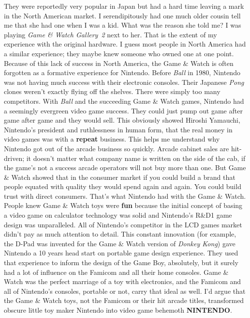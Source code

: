 \documentclass{book}
\begin{document}
They were reportedly very popular in Japan but had a hard time leaving a mark in the North American market. I serendipitously had one much older cousin tell me that she had one when I was a kid. What was the reason she told me? I was playing \emph{Game \& Watch Gallery~2} next to her. That is the extent of my experience with the original hardware. I guess most people in North America had a similar experience; they maybe knew someone who owned one at one point. Because of this lack of success in North America, the Game \& Watch is often forgotten as a formative experience for Nintendo. Before \emph{Ball} in 1980, Nintendo was not having much success with their electronic consoles. Their Japanese \emph{Pong} clones weren’t exactly flying off the shelves. There were simply too many competitors. With \emph{Ball} and the succeeding Game \& Watch games, Nintendo had a seemingly evergreen video game success. They could just pump out game after game after game and they would sell. This obviously showed Hiroshi Yamauchi, Nintendo’s president and ruthlessness in human form, that the real money in video games was with a \textbf{repeat} business. This helps me understand why Nintendo got out of the arcade business so quickly. Arcade cabinet sales are hit-driven; it doesn’t matter what company name is written on the side of the cab, if the game’s not a success arcade operators will not buy more than one. But Game \& Watch showed that in the consumer market if you could build a brand that people equated with quality they would spend again and again. You could build trust with direct consumers. That’s what Nintendo had with the Game \& Watch. People knew Game \& Watch toys were \textbf{fun} because the initial concept of basing a video game on calculator technology was solid and Nintendo’s R\&D1 game design was unparalleled. All of Nintendo’s competitor in the LCD games market didn’t pay as much attention to detail. This constant innovation (for example, the D-Pad was invented for the Game \& Watch version of \emph{Donkey Kong}) gave Nintendo a 10 years head start on portable game design experience. They used that experience to inform the design of the Game Boy, absolutely, but it surely had a lot of influence on the Famicom and all their home consoles. Game \& Watch was the perfect marriage of a toy with electronics, and the Famicom and all of Nintendo’s consoles, portable or not, carry that ideal as well. I’d argue that the Game \& Watch toys, not the Famicom or their hit arcade titles, transformed obscure little toy maker Nintendo into video game behemoth \textbf{NINTENDO}.\par
\end{document}
